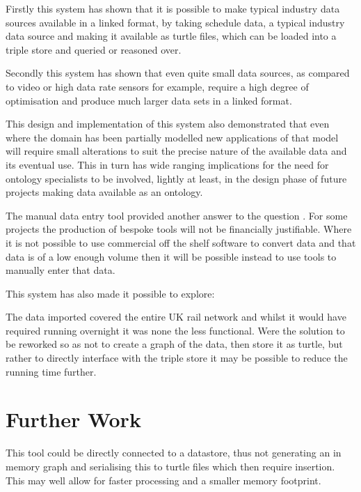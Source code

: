 Firstly this system has shown that it is possible to make typical industry data sources available in a linked format, by taking schedule data, a typical industry data source and making it available as turtle files, which can be loaded into a triple store and queried or reasoned over. 

Secondly this system has shown that even quite small data sources, as compared to video or high data rate sensors for example, require a high degree of optimisation and produce much larger data sets in a linked format. 

This design and implementation of this system also demonstrated that even where the domain has been partially modelled new applications of that model will require small alterations to suit the precise nature of the available data and its eventual use. This in turn has wide ranging implications for the need for ontology specialists to be involved, lightly at least, in the design phase of future projects making data available as an ontology.

The manual data entry tool provided another answer to the question \say{\QuestionOtherData}. For some projects the production of bespoke tools will not be financially justifiable. Where it is not possible to use commercial off the shelf software to convert data and that data is of a low enough volume then it will be possible instead to use tools to manually enter that data.

This system has also made it possible to explore: \textit{\QuestionCanOntologyScale}

The data imported covered the entire UK rail network and whilst it would have required running overnight it was none the less functional. Were the solution to be reworked so as not to create a graph of the data, then store it as turtle, but rather to directly interface with the triple store it may be possible to reduce the running time further.

\section{Further Work}
This tool could be directly connected to a datastore, thus not generating an in memory graph and serialising this to turtle files which then require insertion. This may well allow for faster processing and a smaller memory footprint. 